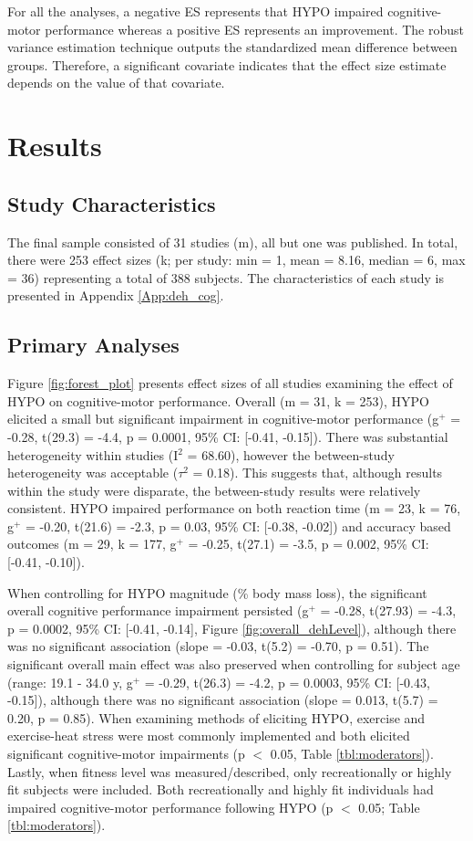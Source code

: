 For all the analyses, a negative ES represents that HYPO impaired cognitive-motor performance whereas a positive ES represents an improvement. The robust variance estimation technique outputs the standardized mean difference between groups. Therefore, a significant covariate indicates that the effect size estimate depends on the value of that covariate.

\section{Results}

\subsection{Study Characteristics}
The final sample consisted of 31 studies (m), all but one \cite{kakos_improving_2013} was published. In total, there were 253 effect sizes (k; per study: min = 1, mean = 8.16, median = 6, max = 36) representing a total of 388 subjects. The characteristics of each study is presented in Appendix \ref{App:deh_cog}. 

\subsection{Primary Analyses}
Figure \ref{fig:forest_plot} presents effect sizes of all studies examining the effect of HYPO on cognitive-motor performance. Overall (m = 31, k = 253), HYPO elicited a small but significant impairment in cognitive-motor performance (g${^+}$ = -0.28, t(29.3) = -4.4, p = 0.0001, 95\% CI: [-0.41, -0.15]). There was substantial heterogeneity within studies (I${^2}$ = 68.60), however the between-study heterogeneity was acceptable (${\tau}$${^2}$ = 0.18). This suggests that, although results within the study were disparate, the between-study results were relatively consistent. HYPO impaired performance on both reaction time (m = 23, k = 76, g${^+}$ = -0.20, t(21.6) = -2.3, p = 0.03, 95\% CI: [-0.38, -0.02]) and accuracy based outcomes (m = 29, k = 177, g${^+}$ = -0.25, t(27.1) = -3.5, p = 0.002, 95\% CI: [-0.41, -0.10]).

When controlling for HYPO magnitude (\% body mass loss), the significant overall cognitive performance impairment persisted (g${^+}$ = -0.28, t(27.93) = -4.3, p = 0.0002, 95\% CI: [-0.41, -0.14], Figure \ref{fig:overall_dehLevel}), although there was no significant association (slope = -0.03, t(5.2) = -0.70, p = 0.51). The significant overall main effect was also preserved when controlling for subject age (range: 19.1 - 34.0 y, g${^+}$ = -0.29, t(26.3) = -4.2, p = 0.0003, 95\% CI: [-0.43, -0.15]), although there was no significant association (slope = 0.013, t(5.7) = 0.20, p = 0.85). When examining methods of eliciting HYPO, exercise and exercise-heat stress were most commonly implemented and both elicited significant cognitive-motor impairments (p $<$ 0.05, Table \ref{tbl:moderators}). Lastly, when fitness level was measured/described, only recreationally or highly fit subjects were included. Both recreationally and highly fit individuals had impaired cognitive-motor performance following HYPO (p ${<}$ 0.05; Table \ref{tbl:moderators}).  

